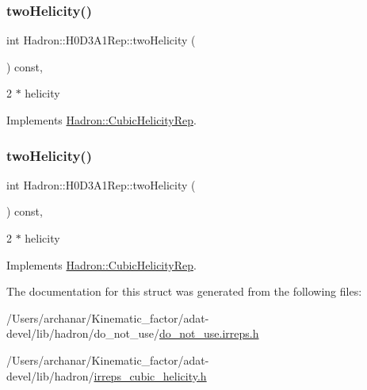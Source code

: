 \subsubsection{\texorpdfstring{twoHelicity()}{twoHelicity()}\hspace{0.1cm}{\footnotesize\ttfamily [2/3]}}
{\footnotesize\ttfamily int Hadron\+::\+H0\+D3\+A1\+Rep\+::two\+Helicity (\begin{DoxyParamCaption}{ }\end{DoxyParamCaption}) const\hspace{0.3cm}{\ttfamily [inline]}, {\ttfamily [virtual]}}

2 $\ast$ helicity 

Implements \mbox{\hyperlink{structHadron_1_1CubicHelicityRep_af507aa56fc2747eacc8cb6c96db31ecc}{Hadron\+::\+Cubic\+Helicity\+Rep}}.

\mbox{\label{structHadron_1_1H0D3A1Rep_a2a2524dad4c9988ef8a9ffb9a5ffa576}} 
\subsubsection{\texorpdfstring{twoHelicity()}{twoHelicity()}\hspace{0.1cm}{\footnotesize\ttfamily [3/3]}}
{\footnotesize\ttfamily int Hadron\+::\+H0\+D3\+A1\+Rep\+::two\+Helicity (\begin{DoxyParamCaption}{ }\end{DoxyParamCaption}) const\hspace{0.3cm}{\ttfamily [inline]}, {\ttfamily [virtual]}}

2 $\ast$ helicity 

Implements \mbox{\hyperlink{structHadron_1_1CubicHelicityRep_af507aa56fc2747eacc8cb6c96db31ecc}{Hadron\+::\+Cubic\+Helicity\+Rep}}.



The documentation for this struct was generated from the following files\+:\begin{DoxyCompactItemize}
\item 
/\+Users/archanar/\+Kinematic\+\_\+factor/adat-\/devel/lib/hadron/do\+\_\+not\+\_\+use/\mbox{\hyperlink{adat-devel_2lib_2hadron_2do__not__use_2do__not__use_8irreps_8h}{do\+\_\+not\+\_\+use.\+irreps.\+h}}\item 
/\+Users/archanar/\+Kinematic\+\_\+factor/adat-\/devel/lib/hadron/\mbox{\hyperlink{adat-devel_2lib_2hadron_2irreps__cubic__helicity_8h}{irreps\+\_\+cubic\+\_\+helicity.\+h}}\end{DoxyCompactItemize}

